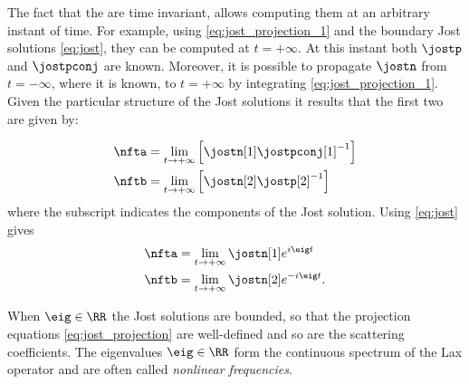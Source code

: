 
The fact that the \scatcoef{} are time invariant, allows computing them at an
arbitrary instant of time. For example, using \eqref{eq:jost_projection_1} and
the boundary Jost solutions \eqref{eq:jost}, they can be computed at $t = +\infty$. At this
instant both $\jostp$ and $\jostpconj$ are known. Moreover, it is possible to
propagate $\jostn$ from $t = -\infty$, where it is known, to $t = +\infty$ by
integrating \eqref{eq:jost_projection_1}. Given the particular structure of the
Jost solutions it results that the first two \scatcoef{} are given by:

\begin{subequations}
\begin{align}
\nfta&=\lim_{t \to +\infty}\left[\jostn[1]\jostpconj[1]^{-1}\right]\\
\nftb&=\lim_{t \to +\infty} \left[\jostn[2] \jostp[2]^{-1}\right]
\end{align}
\end{subequations}
where the subscript indicates the components of the Jost solution.
Using \eqref{eq:jost} gives
\begin{subequations}
\begin{align}\label{eq:scattering_coefficients}
\nfta&=\lim_{t \to +\infty}\jostn[1]e^{i\eig t}\\
\nftb&=
      \lim_{t \to +\infty}
       \jostn[2] e^{-i\eig t}.
\end{align}
\end{subequations}


When $\eig \in \RR$ the Jost solutions are bounded, so that the projection
equations \eqref{eq:jost_projection} are well-defined
and so are the scattering
coefficients. The eigenvalues $\eig \in \RR$ form the continuous spectrum of
the Lax operator and are often called \textit{nonlinear frequencies}.

